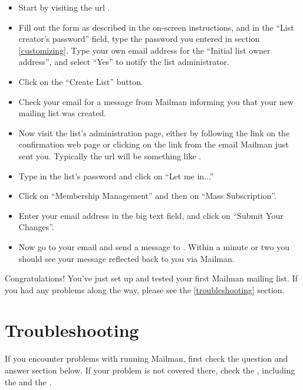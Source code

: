 \documentclass{howto}
\begin{document}
\begin{itemize}
\item Start by visiting the url .

\item Fill out the form as described in the on-screen instructions, and in the
      ``List creator's password'' field, type the password you entered in
      section \ref{customizing}.  Type your own email address for the
      ``Initial list owner address'', and select ``Yes'' to notify the list
      administrator.

\item Click on the ``Create List'' button.

\item Check your email for a message from Mailman informing you that your new
      mailing list was created.

\item Now visit the list's administration page, either by following the link
      on the confirmation web page or clicking on the link from the email
      Mailman just sent you.  Typically the url will be something like
      .

\item Type in the list's password and click on ``Let me in...''

\item Click on ``Membership Management'' and then on ``Mass Subscription''.

\item Enter your email address in the big text field, and click on ``Submit
      Your Changes''.

\item Now go to your email and send a message to .
      Within a minute or two you should see your message reflected back to you
      via Mailman.
\end{itemize}

Congratulations!  You've just set up and tested your first Mailman mailing
list.  If you had any problems along the way, please see the
\ref{troubleshooting} section.

\section{Troubleshooting\label{troubleshooting}}

If you encounter problems with running Mailman, first check the question and
answer section below.  If your problem is not covered there, check the
, including the
 and the
.
\end{document}
